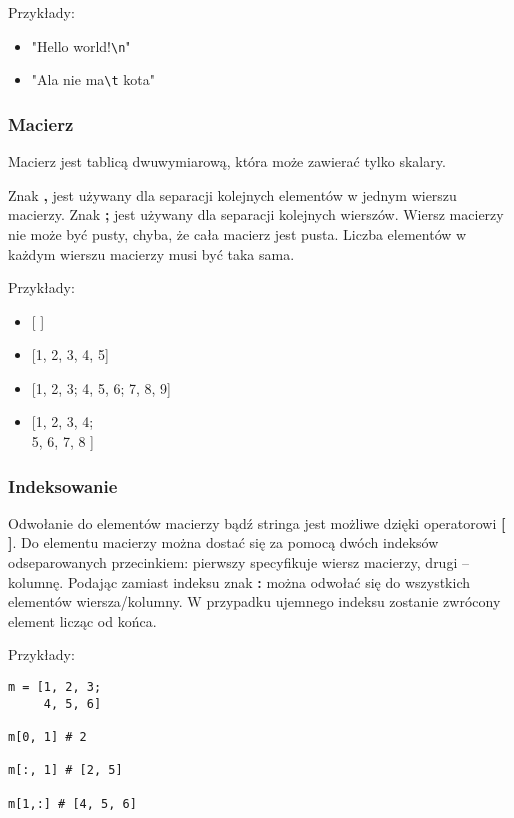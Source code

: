 \documentclass[12pt,a4paper]{article}
\begin{document}
\medskip
Przykłady:
\begin{itemize}

\item "Hello world!\verb+\n+"

\item "Ala nie ma\verb+\t+ kota"
\end{itemize}

\subsubsection{Macierz}
Macierz jest tablicą dwuwymiarową, która może zawierać tylko skalary.

Znak \textbf{,} jest używany dla separacji kolejnych elementów w jednym wierszu macierzy. Znak \textbf{;} jest używany dla separacji kolejnych wierszów. Wiersz macierzy nie może być pusty, chyba, że cała macierz jest pusta. Liczba elementów w każdym wierszu macierzy musi być taka sama.

\bigskip
Przykłady:

\begin{itemize}

\item {[ ]}

\item {[1, 2, 3, 4, 5]}

\item {[1, 2, 3; 4, 5, 6; 7, 8, 9]}

\item {[1, 2, 3, 4;\\
        5, 6, 7, 8  ]}

\end{itemize}

\subsubsection{Indeksowanie}

Odwołanie do elementów macierzy bądź stringa jest możliwe dzięki operatorowi \textbf{[ ]}. Do elementu macierzy można dostać się za pomocą dwóch indeksów odseparowanych przecinkiem: pierwszy specyfikuje wiersz macierzy, drugi -- kolumnę. Podając zamiast indeksu znak \textbf{:} można odwołać się do wszystkich elementów wiersza/kolumny. W przypadku ujemnego indeksu zostanie zwrócony element licząc od końca.

\medskip
Przykłady:

\begin{lstlisting}
m = [1, 2, 3;
     4, 5, 6]
     
m[0, 1] # 2

m[:, 1] # [2, 5]

m[1,:] # [4, 5, 6]
\end{lstlisting}
\end{document}
